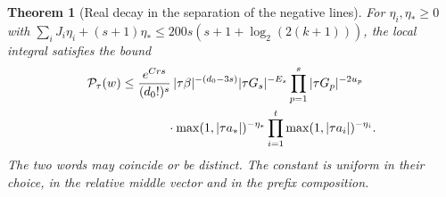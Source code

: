 \documentclass[a4paper,11pt]{article}
\newtheorem{theorem}[proposition]{Theorem}
\theoremstyle{definition}
\theoremstyle{remark}
\numberwithin{equation}{section}
\begin{document}
\begin{theorem}[Real decay in the separation of the negative lines]\leavevmode
\label{thm:regularreal299}
For \(\eta_i,\eta_*\ge0\) with
\(\sum_iJ_i\eta_i+(s+1)\eta_*\le 200s(s+1+\log_2(2(k+1)))\),
the local integral satisfies the bound
\[
\begin{split}
 {\cal P}_\tau(w)
 &\le \frac{e^{Crs}}{(d_0!)^s}\,
    |\tau\beta|^{-(d_0-3s)}
       |\tau G_s|^{-E_s}\prod_{p=1}^s|\tau G_p|^{-2u_p}\\
 &\hspace{1.3cm}\cdot
     \max(1,|\tau a_*|)^{-\eta_*}
     \prod_{i=1}^t\max(1,|\tau a_i|)^{-\eta_i}.
\end{split}
\]
The two words may coincide or be distinct. The constant is
uniform in their choice, in the relative middle vector and
in the prefix composition.
\end{theorem}
\end{document}
